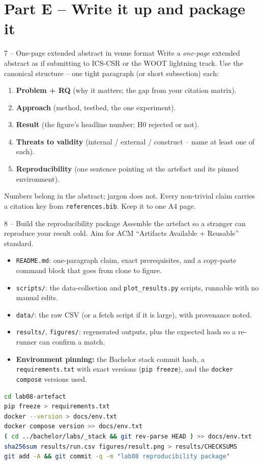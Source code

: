 \documentclass[11pt,a4paper]{article}
\begin{document}
\section*{Part E -- Write it up and package it}

\begin{stepbox}{7 -- One-page extended abstract in venue format}
Write a \emph{one-page} extended abstract as if submitting to ICS-CSR or the WOOT lightning track. Use the canonical structure -- one tight paragraph (or short subsection) each:
\begin{enumerate}\setlength{\itemsep}{1pt}
  \item \textbf{Problem + RQ} (why it matters; the gap from your citation matrix).
  \item \textbf{Approach} (method, testbed, the one experiment).
  \item \textbf{Result} (the figure's headline number; H0 rejected or not).
  \item \textbf{Threats to validity} (internal / external / construct -- name at least one of each).
  \item \textbf{Reproducibility} (one sentence pointing at the artefact and its pinned environment).
\end{enumerate}
Numbers belong in the abstract; jargon does not. Every non-trivial claim carries a citation key from \texttt{references.bib}. Keep it to one A4 page.
\end{stepbox}

\begin{stepbox}{8 -- Build the reproducibility package}
Assemble the artefact so a stranger can reproduce your result cold. Aim for ACM ``Artifacts Available + Reusable'' standard.
\begin{itemize}\setlength{\itemsep}{2pt}
  \item \texttt{README.md}: one-paragraph claim, exact prerequisites, and a copy-paste command block that goes from clone to figure.
  \item \texttt{scripts/}: the data-collection and \texttt{plot\_results.py} scripts, runnable with no manual edits.
  \item \texttt{data/}: the raw CSV (or a fetch script if it is large), with provenance noted.
  \item \texttt{results/}, \texttt{figures/}: regenerated outputs, plus the expected hash so a re-runner can confirm a match.
  \item \textbf{Environment pinning:} the Bachelor stack commit hash, a \texttt{requirements.txt} with exact versions (\texttt{pip freeze}), and the \texttt{docker compose} versions used.
\end{itemize}
\begin{lstlisting}[language=bash]
cd lab08-artefact
pip freeze > requirements.txt
docker --version > docs/env.txt
docker compose version >> docs/env.txt
( cd ../bachelor/labs/_stack && git rev-parse HEAD ) >> docs/env.txt
sha256sum results/run.csv figures/result.png > results/CHECKSUMS
git add -A && git commit -q -m "lab08 reproducibility package"
\end{lstlisting}
\end{stepbox}
\end{document}
